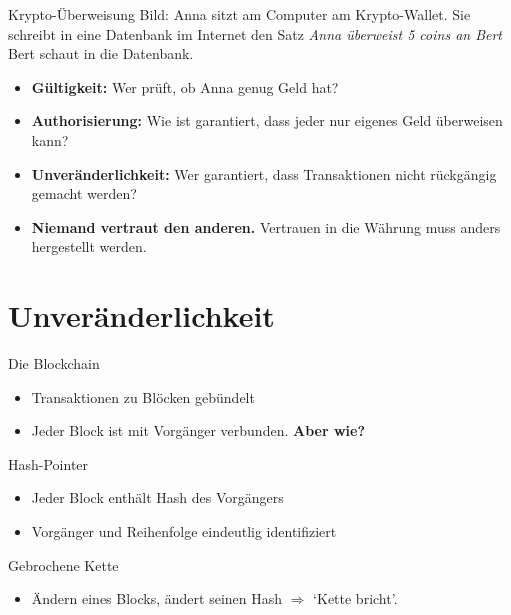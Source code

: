 \documentclass[aspectratio=169]{beamer}
\begin{document}
\begin{frame}{Krypto-Überweisung}
    Bild: Anna sitzt am Computer am Krypto-Wallet. Sie schreibt in eine Datenbank im Internet den Satz \emph{Anna überweist 5 coins an Bert} Bert schaut in die Datenbank.

    \pause
    \begin{itemize}
        \item \textbf{Gültigkeit:} Wer prüft, ob Anna genug Geld hat?
        \item \textbf{Authorisierung:} Wie ist garantiert, dass jeder nur eigenes Geld überweisen kann?
        \item \textbf{Unveränderlichkeit:} Wer garantiert, dass Transaktionen nicht rückgängig gemacht werden?
    \end{itemize}

    \vfill
    \begin{itemize}
        \item \textbf{Niemand vertraut den anderen.} Vertrauen in die Währung muss anders hergestellt werden.
    \end{itemize}
\end{frame}


\section{Unveränderlichkeit}

\begin{frame}{Die Blockchain}
    \begin{itemize}
        \item Transaktionen zu Blöcken gebündelt
        \item Jeder Block ist mit Vorgänger verbunden.
        \pause
        \textbf{Aber wie?}
    \end{itemize}
\end{frame}


\begin{frame}{Hash-Pointer}
    \begin{itemize}
        \item Jeder Block enthält Hash des Vorgängers
        \item Vorgänger und Reihenfolge eindeutlig identifiziert
    \end{itemize}
\end{frame}


\begin{frame}{Gebrochene Kette}
    \begin{itemize}
        \item Ändern eines Blocks, ändert seinen Hash $\Rightarrow$ `Kette bricht'.
    \end{itemize}
\end{frame}
\end{document}
